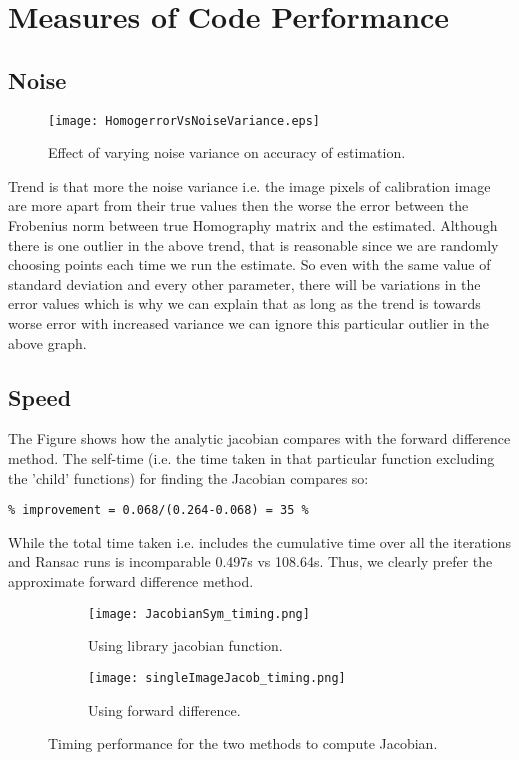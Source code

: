 \documentclass[titlepage]{article}
\begin{document}
\section{Measures of Code Performance}
\subsection{Noise}
\begin{wrapfigure}{r}{5.5cm}
\texttt{[image: HomogerrorVsNoiseVariance.eps]}
\caption{Effect of varying noise variance on accuracy of estimation.}
\label{wrap-fig:1}
\end{wrapfigure} 
Trend is that more the noise variance i.e. the image pixels of calibration image are more apart from their true values then the worse the error between the Frobenius norm between true Homography matrix and the estimated. Although there is one outlier in the above trend, that is reasonable since we are randomly choosing points each time we run the estimate. So even with the same value of standard deviation and every other parameter, there will be variations in the error values which is why we can explain that as long as the trend is towards worse error with increased variance we can ignore this particular outlier in the above graph.
\subsection{Speed}
The Figure shows how the analytic jacobian compares with the forward difference method. The self-time (i.e. the time taken in that particular function excluding the 'child' functions) for finding the Jacobian compares so:
\begin{verbatim}
% improvement = 0.068/(0.264-0.068) = 35 %
\end{verbatim}
While the total time taken i.e. includes the cumulative time over all the iterations and Ransac runs is incomparable 0.497s vs 108.64s. Thus, we clearly prefer the approximate forward difference method.
\begin{figure}[H]
\begin{subfigure}{0.5\textwidth}
\label{Correspond}
\texttt{[image: JacobianSym\_timing.png]}
\caption{Using library jacobian function.}
\end{subfigure}
\begin{subfigure}{0.5\textwidth}
\label{Consensus}
\texttt{[image: singleImageJacob\_timing.png]}
\caption{Using forward difference.}
\end{subfigure}
\caption{Timing performance for the two methods to compute Jacobian.}
\end{figure}
\end{document}
